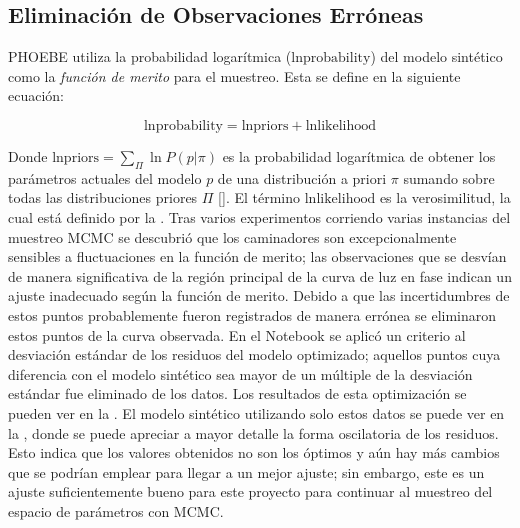 \subsection{Eliminación de Observaciones Erróneas} \label{metodologia:modelocomputacional:mcmc:eliminacion_errores}

PHOEBE utiliza la probabilidad logarítmica ($\mathrm{lnprobability}$) del modelo
sintético como la \textit{función de merito} para el muestreo. Esta se define en
la siguiente ecuación:

\begin{eqfloat}[!ht]
	\centering
	\begin{equation}
		\textrm{lnprobability} = \textrm{lnpriors} + \textrm{lnlikelihood}
	\end{equation}
\end{eqfloat}

Donde $\mathrm{lnpriors} = \sum_{\Pi} \ln{P(p | \pi)}$ es la probabilidad
logarítmica de obtener los parámetros actuales del modelo $p$ de una
distribución a priori $\pi$ sumando sobre todas las distribuciones priores $\Pi$
[]. El
término $\mathrm{lnlikelihood}$ es la verosimilitud, la cual está definido por
la . Tras varios experimentos corriendo
varias instancias del muestreo MCMC se descubrió que los caminadores son
excepcionalmente sensibles a fluctuaciones en la función de merito; las
observaciones que se desvían de manera significativa de la región principal de
la curva de luz en fase indican un ajuste inadecuado según la función de merito.
Debido a que las incertidumbres de estos puntos probablemente fueron registrados
de manera errónea se eliminaron estos puntos de la curva observada. En el
Notebook
\href{https://github.com/KnightIV/UANL_MAPTA_Observaciones/blob/main/analisis/phoebe_model/sampling/remove-bad-observations.ipynb}{}
se aplicó un criterio al desviación estándar de los residuos del modelo
optimizado; aquellos puntos cuya diferencia con el modelo sintético sea mayor de
un múltiple de la desviación estándar fue eliminado de los datos. Los resultados
de esta optimización se pueden ver en la
. El modelo sintético utilizando
solo estos datos se puede ver en la
, donde se puede apreciar a
mayor detalle la forma oscilatoria de los residuos. Esto indica que los valores
obtenidos no son los óptimos y aún hay más cambios que se podrían emplear para
llegar a un mejor ajuste; sin embargo, este es un ajuste suficientemente bueno
para este proyecto para continuar al muestreo del espacio de parámetros con
MCMC.


